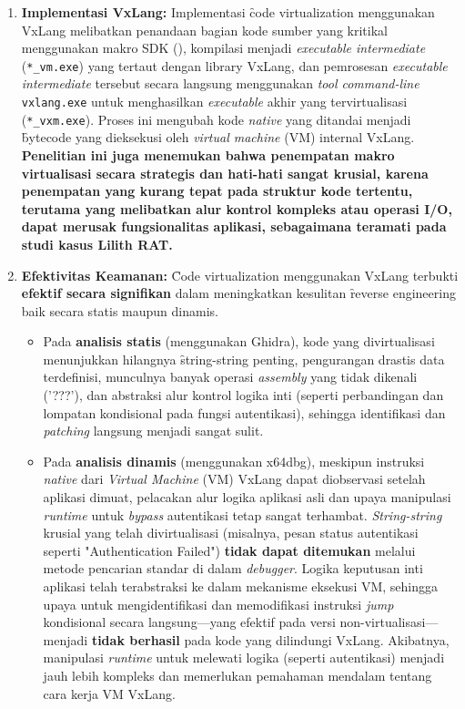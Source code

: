 \begin{enumerate}
    \item \textbf{Implementasi VxLang:} Implementasi \f{code virtualization} menggunakan VxLang melibatkan penandaan bagian kode sumber yang kritikal menggunakan makro SDK (), kompilasi menjadi \textit{executable intermediate} (\texttt{*\_vm.exe}) yang tertaut dengan library VxLang, dan pemrosesan \textit{executable intermediate} tersebut secara langsung menggunakan \textit{tool command-line} \texttt{vxlang.exe} untuk menghasilkan \textit{executable} akhir yang tervirtualisasi (\texttt{*\_vxm.exe}). Proses ini mengubah kode \textit{native} yang ditandai menjadi \f{bytecode} yang dieksekusi oleh \textit{virtual machine} (VM) internal VxLang. \textbf{Penelitian ini juga menemukan bahwa penempatan makro virtualisasi secara strategis dan hati-hati sangat krusial, karena penempatan yang kurang tepat pada struktur kode tertentu, terutama yang melibatkan alur kontrol kompleks atau operasi I/O, dapat merusak fungsionalitas aplikasi, sebagaimana teramati pada studi kasus Lilith RAT.}

    \item \textbf{Efektivitas Keamanan:} \f{Code virtualization} menggunakan VxLang terbukti \textbf{efektif secara signifikan} dalam meningkatkan kesulitan \f{reverse engineering} baik secara statis maupun dinamis.
        \begin{itemize}
            \item Pada \textbf{analisis statis} (menggunakan Ghidra), kode yang divirtualisasi menunjukkan hilangnya \f{string-string} penting, pengurangan drastis data terdefinisi, munculnya banyak operasi \textit{assembly} yang tidak dikenali ('???'), dan abstraksi alur kontrol logika inti (seperti perbandingan dan lompatan kondisional pada fungsi autentikasi), sehingga identifikasi dan \textit{patching} langsung menjadi sangat sulit.
            \item Pada \textbf{analisis dinamis} (menggunakan x64dbg), meskipun instruksi \textit{native} dari \textit{Virtual Machine} (VM) VxLang dapat diobservasi setelah aplikasi dimuat, pelacakan alur logika aplikasi asli dan upaya manipulasi \textit{runtime} untuk \textit{bypass} autentikasi tetap sangat terhambat. \textit{String-string} krusial yang telah divirtualisasi (misalnya, pesan status autentikasi seperti "Authentication Failed") \textbf{tidak dapat ditemukan} melalui metode pencarian standar di dalam \textit{debugger}. Logika keputusan inti aplikasi telah terabstraksi ke dalam mekanisme eksekusi VM, sehingga upaya untuk mengidentifikasi dan memodifikasi instruksi \textit{jump} kondisional secara langsung—yang efektif pada versi non-virtualisasi—menjadi \textbf{tidak berhasil} pada kode yang dilindungi VxLang. Akibatnya, manipulasi \textit{runtime} untuk melewati logika (seperti autentikasi) menjadi jauh lebih kompleks dan memerlukan pemahaman mendalam tentang cara kerja VM VxLang.
        \end{itemize}


\end{enumerate}
